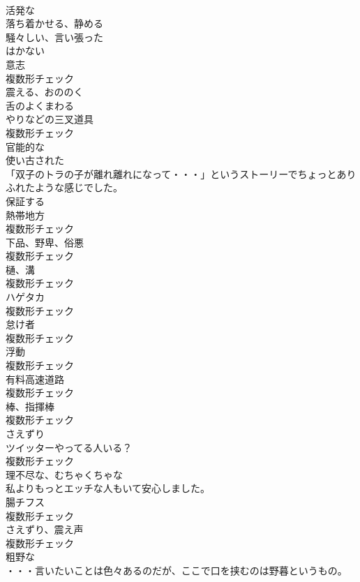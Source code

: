 \documentclass[8pt]{extreport}
\begin{document}
\begin{CJK}{UTF8}{min}
\\	[形容詞]	活発な	
\\	[動詞]	落ち着かせる、静める	
\\	[形容詞]	騒々しい、言い張った	
\\	[形容詞]	はかない	
\\	[名詞]	意志	
\\	複数形チェック
\\	[形容詞]	震える、おののく	
\\	[形容詞]	舌のよくまわる	
\\	[名詞]	やりなどの三叉道具	
\\	複数形チェック
\\	[形容詞]	官能的な	
\\	[形容詞]	使い古された	
\\	「双子のトラの子が離れ離れになって・・・」というストーリーでちょっとありふれたような感じでした。	
\\	[動詞]	保証する	
\\	[名詞]	熱帯地方	
\\	複数形チェック
\\	[名詞]	下品、野卑、俗悪	
\\	複数形チェック
\\	[名詞]	樋、溝	
\\	複数形チェック
\\	[名詞]	ハゲタカ	
\\	複数形チェック
\\	[名詞]	怠け者	
\\	複数形チェック
\\	[名詞]	浮動	
\\	複数形チェック
\\	[名詞]	有料高速道路	
\\	複数形チェック
\\	[名詞]	棒、指揮棒	
\\	複数形チェック
\\	[名詞]	さえずり	
\\	ツイッターやってる人いる？	
\\	複数形チェック
\\	[形容詞]	理不尽な、むちゃくちゃな	
\\	私よりもっとエッチな人もいて安心しました。	
\\	[名詞]	腸チフス	
\\	複数形チェック
\\	[名詞]	さえずり、震え声	
\\	複数形チェック
\\	[形容詞]	粗野な	
\\	・・・言いたいことは色々あるのだが、ここで口を挟むのは野暮というもの。	

\end{CJK}
\end{document}
